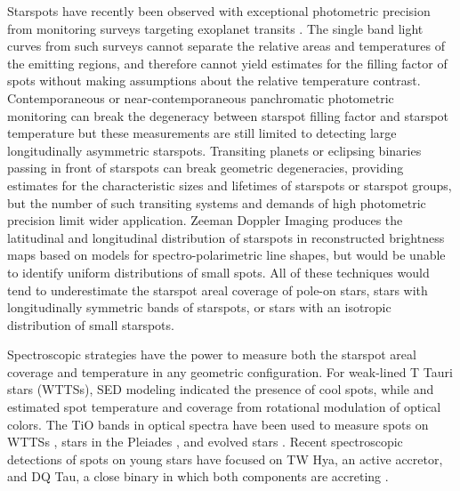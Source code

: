\documentclass[twocolumn]{emulateapj}%
\begin{document}
Starspots have recently been observed with exceptional photometric precision from monitoring surveys targeting exoplanet transits \citep[\emph{e.g}][]{harrison11,davenport15}.  The single band light curves from such surveys cannot separate the relative areas and temperatures of the emitting regions, and therefore cannot yield estimates for the filling factor of spots without making assumptions about the relative temperature contrast. Contemporaneous or near-contemporaneous panchromatic photometric monitoring \citep{petrov94,bouvier95,grankin07,cody14} can break the degeneracy between starspot filling factor and starspot temperature but these measurements are still limited to detecting large longitudinally asymmetric starspots.  Transiting planets or eclipsing binaries passing in front of starspots \citep{desert11} can break geometric degeneracies, providing estimates for the characteristic sizes and lifetimes of starspots or starspot groups, but the number of such transiting systems and demands of high photometric precision limit wider application.  Zeeman Doppler Imaging \citep[ZDI]{donati14} produces the latitudinal and longitudinal distribution of starspots in reconstructed brightness maps based on models for spectro-polarimetric line shapes, but would be unable to identify uniform distributions of small spots.  All of these techniques would tend to underestimate the starspot areal coverage of pole-on stars, stars with longitudinally symmetric bands of starspots, or stars with an isotropic distribution of small starspots.  

Spectroscopic strategies have the power to measure both the starspot areal coverage and temperature in any geometric configuration.  For weak-lined T Tauri stars (WTTSs), SED modeling \citep{wolk96} indicated the presence of cool spots, while \citet{grankin98} and \citet{venuti15} estimated spot temperature and coverage from rotational modulation of optical colors.  The TiO bands in optical spectra have been used to measure spots on WTTSs \citep{petrov94}, stars in the Pleiades \citep{fang2016}, and evolved stars \citep[e.g.][]{neff95,oneal01,oneal04}.  Recent spectroscopic detections of spots on young stars have focused on TW Hya, an active accretor, and DQ Tau, a close binary in which both components are accreting \citep{debes13,bary14}.  
\end{document}
